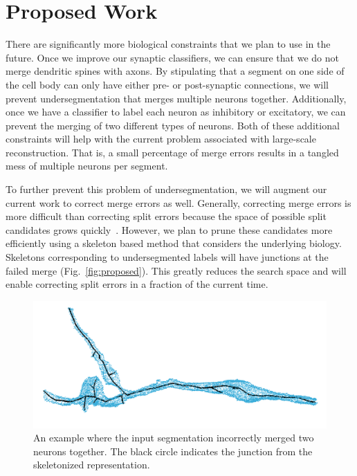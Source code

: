 \section{Proposed Work}

There are significantly more biological constraints that we plan to use in the future.
Once we improve our synaptic classifiers, we can ensure that we do not merge dendritic spines with axons. 
By stipulating that a segment on one side of the cell body can only have either pre- or post-synaptic connections, we will prevent undersegmentation that merges multiple neurons together.
Additionally, once we have a classifier to label each neuron as inhibitory or excitatory, we can prevent the merging of two different types of neurons.
Both of these additional constraints will help with the current problem associated with large-scale reconstruction.
That is, a small percentage of merge errors results in a tangled mess of multiple neurons per segment.

To further prevent this problem of undersegmentation, we will augment our current work to correct merge errors as well.
Generally, correcting merge errors is more difficult than correcting split errors because the space of possible split candidates grows quickly~\cite{parag2015properties}. 
However, we plan to prune these candidates more efficiently using a skeleton based method that considers the underlying biology.
Skeletons corresponding to undersegmented labels will have junctions at the failed merge (Fig.~\ref{fig:proposed}). 
This greatly reduces the search space and will enable correcting split errors in a fraction of the current time.

\begin{figure}
	\centering
	\includegraphics[width=0.8\linewidth]{./figures/split-proposal.png}
	\caption{An example where the input segmentation incorrectly merged two neurons together. The black circle indicates the junction from the skeletonized representation.}
	\label{fig:proposal}
\end{figure}

